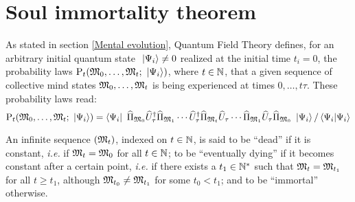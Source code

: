 


\section{Soul immortality theorem}

 As stated in section \ref{Mental evolution}, Quantum Field Theory defines, for an arbitrary initial quantum state $\ \left|{\Psi_i}\right\rangle \neq 0$ realized at the initial time $t_i = 0$, the probability laws $\mathrm P_t(\mathfrak{M}_0, \dotsc, \mathfrak{M}_t; \ \left|{\Psi_i}\right\rangle)$, where $t \in \mathbb{N}$, that a given sequence of collective mind states $\mathfrak{M}_0, \dotsc, \mathfrak{M}_t$ is being experienced at times $0, \dotsc, t \tau$. These probability laws read:
\begin{equation*}
\mathrm P_t(\mathfrak{M}_0, \dotsc, \mathfrak{M}_t; \ \left|{\Psi_i}\right\rangle) = \left\langle{\Psi_i}\right|\  \widehat{\Pi}_{\mathfrak{M}_0} \widehat{U}^{\dagger}_\tau \widehat{\Pi}_{\mathfrak{M}_1} \dotsm \widehat{U}^{\dagger}_\tau \widehat{\Pi}_{\mathfrak{M}_t} \widehat{U}_\tau \dotsm \widehat{\Pi}_{\mathfrak{M}_1} \widehat{U}_\tau \widehat{\Pi}_{\mathfrak{M}_0} \ \left|{\Psi_i}\right\rangle / \left\langle{\Psi_i}|{\Psi_i}\right\rangle
\end{equation*}

 An infinite sequence $(\mathfrak{M}_t)$, indexed on $t \in \mathbb{N}$, is said to be ``dead'' if it is constant, \textit{i.e.} if $\mathfrak{M}_t = \mathfrak{M}_0$ for all $t \in \mathbb{N}$; to be ``eventually dying'' if it becomes constant after a certain point, \textit{i.e.} if there exists a $t_1 \in \mathbb{N}^*$ such that $\mathfrak{M}_t = \mathfrak{M}_{t_1}$ for all $t \geq t_1$, although $\mathfrak{M}_{t_0} \neq \mathfrak{M}_{t_1}$ for some $t_0 < t_1$; and to be ``immortal'' otherwise.

